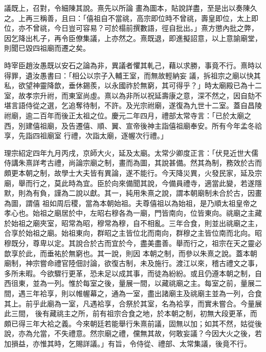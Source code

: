 \begin{pinyinscope}
 議既上，召對，令細陳其說。熹先以所論
 畫為圖本，貼說詳盡，至是出以奏陳久之。上再三稱善，且曰：「僖祖自不當祧，高宗即位時不曾祧，壽皇即位，太上即位，亦不曾祧，今日豈可容易？可於榻前撰數語，徑自批出。」熹方懲內批之弊，因乞降出札子，再令臣僚集議，上亦然之。熹既退，即進擬詔意，以上意諭廟堂，則聞已毀四祖廟而遷之矣。



 時宰臣趙汝愚既以安石之論為非，異議者懼其軋己，藉以求勝，事竟不行。熹時以得罪，遺汝愚書曰：「相公以宗子入輔王室，而無故輕納妄
 議，拆祖宗之廟以快其私，欲望神靈降歆，垂休錫羨，以永國祚於無窮，其可得乎？」時太廟殿已為十二室，故孝宗升祔，而東室尚虛。熹以為非所以祝延壽康之意，深不然之，因自劾不堪言語侍從之選，乞追奪待制，不許。及光宗祔廟，遂復為九世十二室。蓋自昌陵祔廟，逾二百年而後正太祖之位。慶元二年四月，禮部太常寺言：「已於太廟之西，別建僖祖廟，及告遷僖、順、翼、宣帝後神主詣僖祖廟奉安。所有今年孟冬祫享，先詣四祖廟室
 行禮，次詣太廟，逐幄次行禮。」



 理宗紹定四年九月丙戌，京師大火，延及太廟。太常少卿度正言：「伏見近世大儒侍講朱熹詳考古禮，尚論宗廟之制，畫而為圖，其說甚備。然其為制，務效於古而頗更本朝之制，故學士大夫皆有異論，遂不能行。今天降災異，火發民家，延及宗廟，舉而行之，莫此時為宜。臣於向來備聞其說，今備員禮寺，適當此變，若遂隱默，則為有負，謹為二說以獻。其一，純用朱熹之說，謂本朝廟制未合於古，因畫為圖，謂僖
 祖如周后稷，當為本朝始祖。夫尊僖祖以為始祖，是乃順太祖皇帝之孝心也。始祖之廟居於中，左昭右穆各為一廟，門皆南向，位皆東向。祧廟之主藏於始祖之廟夾室，昭常為昭，穆常為穆，自不相亂。三年合食，則並出祧廟之主，合享於始祖之廟。始祖東向，群昭之主皆位北而南向，群穆之主皆位南而北向。昭穆既分，尊卑以定。其說合於古而宜於今，盡美盡善。舉而行之，祖宗在天之靈必歆享於此，而垂祐於無窮也。其一說，則因
 本朝之制，而參以朱熹之說。蓋本朝廟制，神宗嘗命禮官陸佃討論，欲復古制，未及施行。渡江以來，稽古禮文之事，多所未暇。今欲驟行更革，恐未足以成其事，而徒為紛紛。或且仍遵本朝之制，自西徂東，並為一列。惟於每室之後，量展一間，以藏祧廟之主。每室之前，量展二間，遇三年袷享，則以帷幄幕之，通為一室，盡出諸廟主及祧廟主並為一列，合食其上。前乎此廟為一室，凡遇袷享，合祭於其室，名為袷享，而實未嘗合。今量展此三間，
 後有藏祧主之所，前有祖宗合食之地，於本朝之制，初無大段更革，而頗已得三年大袷之義。今來朝廷若能舉行朱熹前議，固無以加；如其不然，姑從後說，亦為允當，不失禮意。然宗廟之禮，儻無其故，何敢妄議？今因大火之後，若加損益，亦惟其時，乞賜詳議。」有旨，令侍從、禮部、太常集議，後竟不行。



\end{pinyinscope}